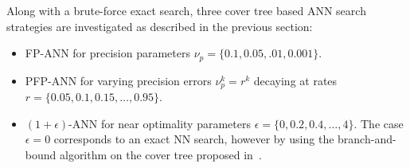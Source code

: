 %		
%		
%		



Along with a brute-force exact search,  three cover tree based ANN search strategies are investigated as described in the previous section:
\begin{itemize}
	\item FP-ANN for precision parameters $\nu_p= \{0.1, 0.05, .01, 0.001\}$.
	\item PFP-ANN for varying precision errors $\nu_p^k=r^k$ decaying at rates $r=\{0.05, 0.1,0.15,\ldots,0.95\}$.
	\item $(1+\epsilon)$-ANN for near optimality parameters $\epsilon=\{0, 0.2,0.4,\ldots,4\}$. 
	The case $\epsilon=0$ corresponds to an exact NN search, however by using the branch-and-bound algorithm on the cover tree proposed in~\cite{beygelzimer2006cover}.
\end{itemize}


